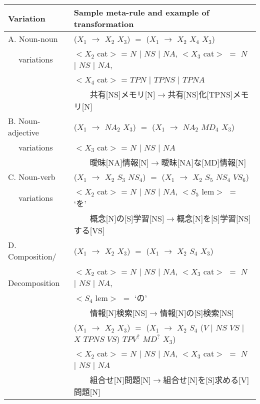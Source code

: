 \begin{table}
\begin{center}
{\footnotesize
\begin{tabular}{ll} 
\hline
Variation & Sample meta-rule and example of transformation\\
\hline
\hline
A. Noun-noun & ($X_1$ $\rightarrow$ $X_2$ $X_3$) $=$ ($X_1$ $\rightarrow$ $X_2$ $X_4$ $X_3$)\\
　 variations & $<X_2$ cat$>$ = $N$ $|$ $NS$ $|$ $NA$, \quad $<X_3$ cat$>$ $=$ $N$ $|$ $NS$ $|$ $NA$,\\
& $<X_4$ cat$>$ = $TPN$ $|$ $TPNS$ $|$ $TPNA$\\
& 　　共有[NS]メモリ[N]$\rightarrow$共有[NS]化[TPNS]メモリ[N]\\
\hline

B. Noun-adjective & ($X_1$ $\rightarrow$ $NA_2$ $X_3$) $=$ ($X_1$ $\rightarrow$ $NA_2$ $MD_4$ $X_3$)\\
　 variations & $<X_3$ cat$>$ = $N$ $|$ $NS$ $|$ $NA$\\
& 　　曖昧[NA]情報[N]$\rightarrow$曖昧[NA]な[MD]情報[N]\\
\hline

C. Noun-verb & ($X_1$ $\rightarrow$ $X_2$ $S_3$ $NS_4$) $=$ ($X_1$ $\rightarrow$ $X_2$ $S_5$ $NS_4$ $VS_6$)\\
　 variations & $<X_2$ cat$>$ = $N$ $|$ $NS$ $|$ $NA$, \quad $<S_5$ lem$>$ $=$ `を'\\
& 　　概念[N]の[S]学習[NS]$\rightarrow$概念[N]を[S]学習[NS]する[VS]\\
\hline

D. Composition/ & ($X_1$ $\rightarrow$ $X_2$ $X_3$) $=$ ($X_1$ $\rightarrow$ $X_2$ $S_4$ $X_3$)\\
　 Decomposition & $<X_2$ cat$>$ = $N$ $|$ $NS$ $|$ $NA$, \quad $<X_3$ cat$>$ $=$ $N$ $|$ $NS$ $|$ $NA$,\\
& $<S_4$ lem$>$ $=$ `の'\\
& 　　情報[N]検索[NS]$\rightarrow$情報[N]の[S]検索[NS]\\
& ($X_1$ $\rightarrow$ $X_2$ $X_3$) $=$ ($X_1$ $\rightarrow$ $X_2$ $S_4$ ($V$ $|$ $NS$ $VS$ $|$ $X$ $TPNS$ $VS$) $TPV^?$ $MD^?$ $X_3$)\\
& $<X_2$ cat$>$ = $N$ $|$ $NS$ $|$ $NA$, \quad $<X_3$ cat$>$ $=$ $N$ $|$ $NS$ $|$ $NA$\\
& 　　組合せ[N]問題[N]$\rightarrow$組合せ[N]を[S]求める[V]問題[N]\\
\hline


\end{tabular}}
\end{center}
\end{table}
